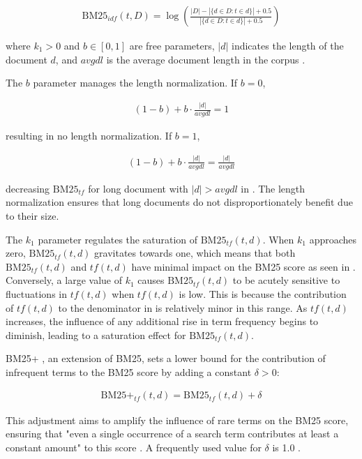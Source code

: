 \begin{align}
    \text{BM25}_{idf}(t, D) = \log \left( \frac{|D| - |\{d \in D : t \in d\}| + 0.5}{|\{d \in D : t \in d\}| + 0.5} \right) \label{eq:bm25-idf}
\end{align}

where $k_1 > 0$ and $b \in [0, 1]$ are free parameters, $|d|$ indicates the length of the document $d$, and $avgdl$ is the average document length in the corpus \cite{RobertsonOkapiTREC31995}.

The $b$ parameter manages the length normalization. If $b = 0$,

\begin{align}
    (1 - b) + b \cdot \frac{|d|}{avgdl} = 1 \label{eq:bm25-b-0}
\end{align}

resulting in no length normalization.
If $b = 1$,

\begin{align}
    (1 - b) + b \cdot \frac{|d|}{avgdl} = \frac{|d|}{avgdl} \label{eq:bm25-b-1}
\end{align}

decreasing $\text{BM25}_{tf}$ for long document with $|d| > avgdl$ in .
The length normalization ensures that long documents do not disproportionately benefit due to their size.

The $k_1$ parameter regulates the saturation of $\text{BM25}_{tf}(t, d)$. When $k_1$ approaches zero, $\text{BM25}_{tf}(t, d)$ gravitates towards one, which means that both $\text{BM25}_{tf}(t, d)$ and $tf(t, d)$ have minimal impact on the BM25 score as seen in .
Conversely, a large value of $k_1$ causes $\text{BM25}_{tf}(t, d)$ to be acutely sensitive to fluctuations in $tf(t, d)$ when $tf(t, d)$ is low. This is because the contribution of $tf(t, d)$ to the denominator in  is relatively minor in this range. As $tf(t, d)$ increases, the influence of any additional rise in term frequency begins to diminish, leading to a saturation effect for $\text{BM25}_{tf}(t, d)$.

BM25+ \cite{LvLowerboundingTerm2011}, an extension of BM25, sets a lower bound for the contribution of infrequent terms to the BM25 score by adding a constant $\delta > 0$:

\begin{align}
    \text{BM25+}_{tf}(t, d) = \text{BM25}_{tf}(t, d) + \delta \label{eq:bm25+-tf}
\end{align}

This adjustment aims to amplify the influence of rare terms on the BM25 score, ensuring that "even a single occurrence of a search term contributes at least a constant amount" to this score \cite{TrotmanImprovementsBM252014}. A frequently used value for $\delta$ is 1.0 \cite{LvLowerboundingTerm2011}.


